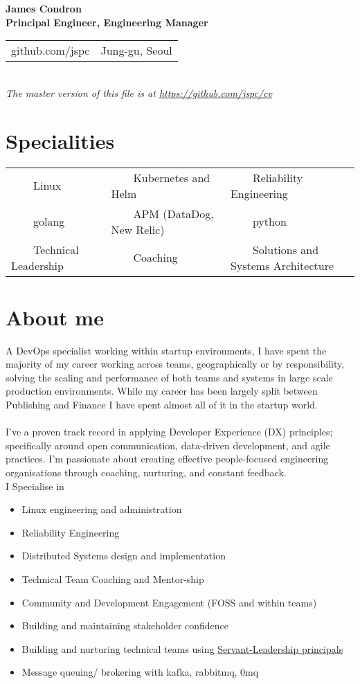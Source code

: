 \documentclass[11pt,a4paper,sans]{article}
\newcommand{\tabitem}{~~\llap{\textbullet}~~}
\begin{document}
\begin{center}
  {\huge\textbf{James Condron}}\\
  \textbf{Principal Engineer, Engineering Manager} \\

  \begin{tabular}{rl}
    github.com/jspc &  Jung-gu, Seoul
  \end{tabular} \\

  {\footnotesize\textit{The master version of this file is at \url{https://github.com/jspc/cv}}}
\end{center}

\section{Specialities}
\begin{tabular}{lll}
  \tabitem Linux & \tabitem Kubernetes and Helm & \tabitem Reliability Engineering \\
  \tabitem golang & \tabitem APM (DataDog, New Relic) & \tabitem python \\
  \tabitem Technical Leadership & \tabitem Coaching & \tabitem Solutions and Systems Architecture
\end{tabular}

\section{About me}
A DevOps specialist working within startup environments, I have spent the majority of my career working across teams, geographically or by responsibility, solving the scaling and performance of both teams and systems in large scale production environments. While my career has been largely split between Publishing and Finance I have spent almost all of it in the startup world. \\
\\
I've a proven track record in applying Developer Experience (DX) principles; specifically around open communication, data-driven development, and agile practices. I'm passionate about creating effective people-focused engineering organisations through coaching, nurturing, and constant feedback.
\\
I Specialise in

\begin{itemize}
\item Linux engineering and administration
\item Reliability Engineering
\item Distributed Systems design and implementation
\item Technical Team Coaching and Mentor-ship
\item Community and Development Engagement (FOSS and within teams)
\item Building and maintaining stakeholder confidence
\item Building and nurturing technical teams using \href{https://www.mindtools.com/pages/article/servant-leadership.htm}{Servant-Leadership principals}
\item Message queuing/ brokering with kafka, rabbitmq, 0mq
\end{itemize}
\end{document}
